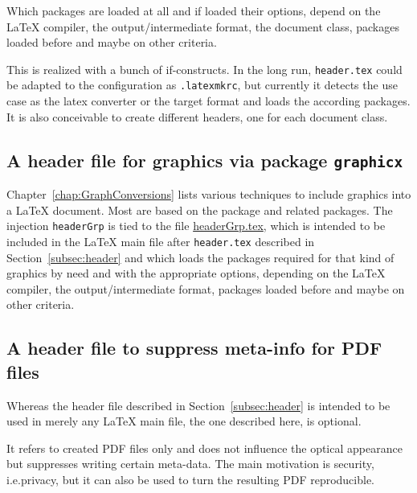 Which packages are loaded at all and if loaded their options, 
depend on the \LaTeX{} compiler, the output/intermediate format, 
the document class, packages loaded before and maybe on other criteria. 

This is realized with a bunch of if-constructs. 
In the long run, \texttt{header.tex} could be adapted 
to the configuration as \texttt{.latexmkrc}, 
but currently it detects the use case 
as the latex converter or the target format 
and loads the according packages. 
It is also conceivable to create different headers, one for each document class. 


\subsection{A header file for graphics via package \texttt{graphicx} }%
\label{subsec:headerGrp}

Chapter~\ref{chap:GraphConversions} lists various techniques 
to include graphics into a \LaTeX{} document. 
Most are based on the package  and related packages. 
The injection \texttt{headerGrp} 
is tied to the file \href{\urlSite fromTex/headerGrp.tex}{headerGrp.tex}, 
which is intended to be included in the \LaTeX{} main file 
after \texttt{header.tex} described in Section~\ref{subsec:header} 
and which loads the packages required for that kind of graphics 
by need and with the appropriate options, 
depending on the \LaTeX{} compiler, the output/intermediate format, 
packages loaded before and maybe on other criteria. 


\subsection{A header file to suppress meta-info for PDF files }\label{subsec:headerSuppressMetaPDF}

Whereas the header file described in Section~\ref{subsec:header} is intended to be used 
in merely any \LaTeX{} main file, 
the one described here, is optional. 

It refers to created PDF files only and does not influence the optical appearance 
but suppresses writing certain meta-data. 
The main motivation is security, i.e.\@ privacy, 
but it can also be used to turn the resulting PDF reproducible. 

